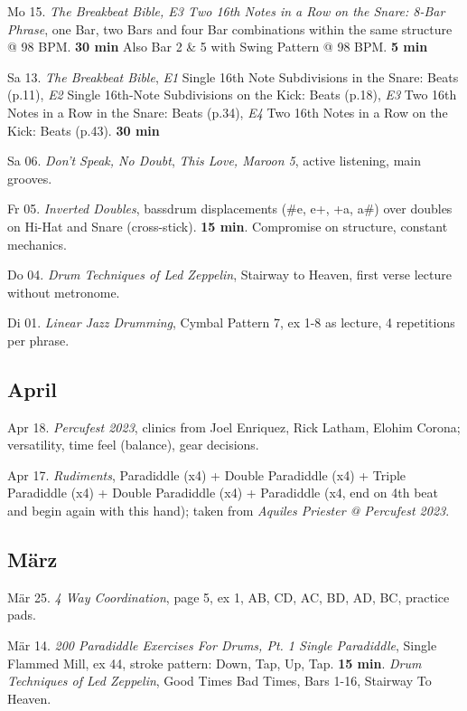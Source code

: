 \documentclass[
]{book}
\begin{document}
Mo 15. \emph{The Breakbeat Bible, E3 Two 16th Notes in a Row on the Snare: 8-Bar Phrase}, one Bar, two Bars and four Bar combinations within the same structure @ 98 BPM. \textbf{30 min} Also Bar 2 \& 5 with Swing Pattern @ 98 BPM. \textbf{5 min}

Sa 13. \emph{The Breakbeat Bible}, \emph{E1} Single 16th Note Subdivisions in the Snare: Beats (p.11), \emph{E2} Single 16th-Note Subdivisions on the Kick: Beats (p.18), \emph{E3} Two 16th Notes in a Row in the Snare: Beats (p.34), \emph{E4} Two 16th Notes in a Row on the Kick: Beats (p.43). \textbf{30 min}

Sa 06. \emph{Don't Speak, No Doubt}, \emph{This Love, Maroon 5}, active listening, main grooves.

Fr 05. \emph{Inverted Doubles}, bassdrum displacements (\#e, e+, +a, a\#) over doubles on Hi-Hat and Snare (cross-stick). \textbf{15 min}. Compromise on structure, constant mechanics.

Do 04. \emph{Drum Techniques of Led Zeppelin}, Stairway to Heaven, first verse lecture without metronome.

Di 01. \emph{Linear Jazz Drumming}, Cymbal Pattern 7, ex 1-8 as lecture, 4 repetitions per phrase.

\subsection*{April}\label{april-2023}

Apr 18. \emph{Percufest 2023}, clinics from Joel Enriquez, Rick Latham, Elohim Corona; versatility, time feel (balance), gear decisions.

Apr 17. \emph{Rudiments}, Paradiddle (x4) + Double Paradiddle (x4) + Triple Paradiddle (x4) + Double Paradiddle (x4) + Paradiddle (x4, end on 4th beat and begin again with this hand); taken from \emph{Aquiles Priester @ Percufest 2023}.

\subsection*{März}\label{maerz-2023}

Mär 25. \emph{4 Way Coordination}, page 5, ex 1, AB, CD, AC, BD, AD, BC, practice pads.

Mär 14. \emph{200 Paradiddle Exercises For Drums, Pt. 1 Single Paradiddle}, Single Flammed Mill, ex 44, stroke pattern: Down, Tap, Up, Tap. \textbf{15 min}. \emph{Drum Techniques of Led Zeppelin}, Good Times Bad Times, Bars 1-16, Stairway To Heaven.
\end{document}
